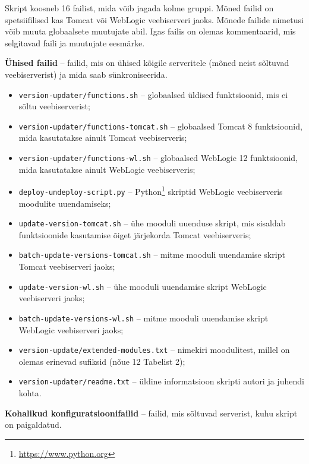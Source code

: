 \documentclass[12pt]{article}
\newcommand{\code}[1]{\texttt{#1}}
\begin{document}
  Skript koosneb 16 failist, mida võib jagada kolme gruppi. Mõned failid on spetsiifilised kas Tomcat või WebLogic veebiserveri jaoks. Mõnede failide nimetusi võib muuta globaalsete muutujate abil. Igas failis on olemas kommentaarid, mis selgitavad faili ja muutujate eesmärke.

  \textbf{Ühised failid} \--- failid, mis on ühised kõigile serveritele (mõned neist sõltuvad veebiserverist) ja mida saab sünkroniseerida.
  
  \begin{itemize}
    \item \code{version-updater/functions.sh} \--- globaalsed üldised funktsioonid, mis ei sõltu veebiserverist;
    \item \code{version-updater/functions-tomcat.sh} \--- globaalsed Tomcat 8 funktsioonid, mida kasutatakse ainult Tomcat veebiserveris;
    \item \code{version-updater/functions-wl.sh} \--- globaalsed WebLogic 12 funktsioonid, mida kasutatakse ainult WebLogic veebiserveris;
    \item \code{deploy-undeploy-script.py} \--- Python\footnote{\url{https://www.python.org}} skriptid WebLogic veebiserveris moodulite uuendamiseks;
    \item \code{update-version-tomcat.sh} \--- ühe mooduli uuenduse skript, mis sisaldab funktsioonide kasutamise õiget järjekorda Tomcat veebiserveris;
    \item \code{batch-update-versions-tomcat.sh} \--- mitme mooduli uuendamise skript Tomcat veebiserveri jaoks;
    \item \code{update-version-wl.sh} \--- ühe mooduli uuendamise skript WebLogic veebiserveri jaoks;
    \item \code{batch-update-versions-wl.sh} \--- mitme mooduli uuendamise skript WebLogic veebiserveri jaoks;
    \item \code{version-update/extended-modules.txt} \--- nimekiri moodulitest, millel on olemas erinevad sufiksid (nõue 12 Tabelist 2);
    \item \code{version-updater/readme.txt} \--- üldine informatsioon skripti autori ja juhendi kohta.
  \end{itemize}
  
  \textbf{Kohalikud konfiguratsioonifailid} \--- failid, mis sõltuvad serverist, kuhu skript on paigaldatud.
  
\end{document}
